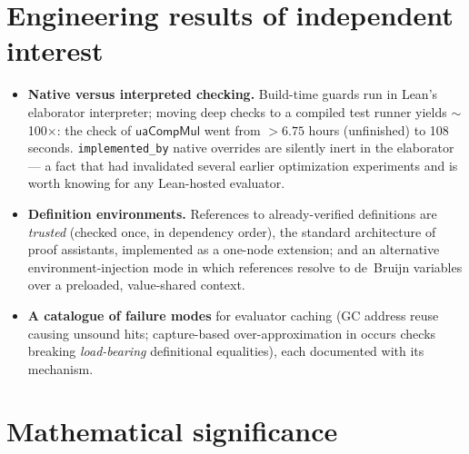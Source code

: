 \documentclass[11pt]{article}
\newcommand{\op}[1]{\ensuremath{\mathsf{#1}}}
\begin{document}
\section{Engineering results of independent interest}
\begin{itemize}[leftmargin=1.5em]
\item \textbf{Native versus interpreted checking.}  Build-time guards run
in Lean's elaborator interpreter; moving deep checks to a compiled test
runner yields $\sim$100$\times$: the check of $\op{uaCompMul}$ went from
$>6.75$ hours (unfinished) to 108 seconds.  \texttt{implemented\_by}
native overrides are silently inert in the elaborator --- a fact that had
invalidated several earlier optimization experiments and is worth knowing
for any Lean-hosted evaluator.
\item \textbf{Definition environments.}  References to already-verified
definitions are \emph{trusted} (checked once, in dependency order), the
standard architecture of proof assistants, implemented as a one-node
extension; and an alternative environment-injection mode in which
references resolve to de~Bruijn variables over a preloaded, value-shared
context.
\item \textbf{A catalogue of failure modes} for evaluator caching
(GC address reuse causing unsound hits; capture-based over-approximation
in occurs checks breaking \emph{load-bearing} definitional equalities),
each documented with its mechanism.
\end{itemize}

\section{Mathematical significance}
\end{document}
